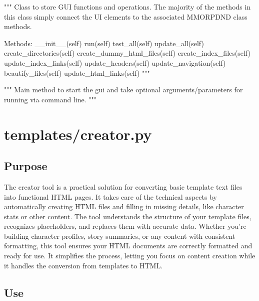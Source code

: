 \begin{classbox}
"""
Class to store GUI functions and operations. The majority of the methods in this class simply connect the UI elements to the associated MMORPDND class methods.
	
Methods:
	__init__(self)
	run(self)
	test_all(self)
	update_all(self)
	create_directories(self)
	create_dummy_html_files(self)
	create_index_files(self)
	update_index_links(self)
	update_headers(self)
	update_navigation(self)
	beautify_files(self)
	update_html_links(self)
"""
\end{classbox}

\begin{codebox}[main()]
"""
Main method to start the gui and take optional arguments/parameters for running via command line.
"""
\end{codebox}













\section{templates/creator.py}



\subsection{Purpose}

The creator tool is a practical solution for converting basic template text files into functional HTML pages. It takes care of the technical aspects by automatically creating HTML files and filling in missing details, like character stats or other content. The tool understands the structure of your template files, recognizes placeholders, and replaces them with accurate data. Whether you're building character profiles, story summaries, or any content with consistent formatting, this tool ensures your HTML documents are correctly formatted and ready for use. It simplifies the process, letting you focus on content creation while it handles the conversion from templates to HTML.

\subsection{Use}

